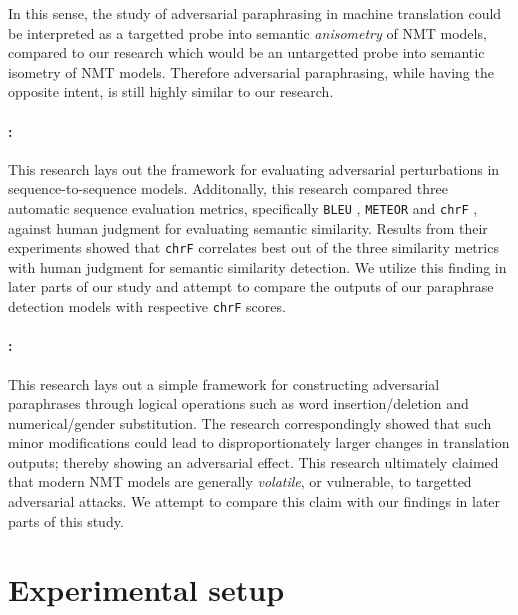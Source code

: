 \documentclass[11pt,a4paper]{article}
\begin{document}
In this sense, the study of adversarial paraphrasing in machine translation could be interpreted as a targetted probe into semantic \textit{anisometry} of NMT models, compared to our research which would be an untargetted probe into semantic isometry of NMT models. Therefore adversarial paraphrasing, while having the opposite intent, is still highly similar to our research.

\paragraph{\citet{michel2019evaluation}:} This research lays out the framework for evaluating adversarial perturbations in sequence-to-sequence models. Additonally, this research compared three automatic sequence evaluation metrics, specifically \texttt{BLEU} \cite{papineni2002bleu}, \texttt{METEOR} \cite{denkowski2014meteor} and \texttt{chrF} \cite{popovic2015chrf}, against human judgment for evaluating semantic similarity. Results from their experiments showed that \texttt{chrF} correlates best out of the three similarity metrics with human judgment for semantic similarity detection. We utilize this finding in later parts of our study and attempt to compare the outputs of our paraphrase detection models with respective \texttt{chrF} scores.

\paragraph{\citet{fadaee2020unreasonable}:} This research lays out a simple framework for constructing adversarial paraphrases through logical operations such as word insertion/deletion and numerical/gender substitution. The research correspondingly showed that such minor modifications could lead to disproportionately larger changes in translation outputs; thereby showing an adversarial effect. This research ultimately claimed that modern NMT models are generally \textit{volatile}, or vulnerable, to targetted adversarial attacks. We attempt to compare this claim with our findings in later parts of this study. 


\section{Experimental setup}
\end{document}
